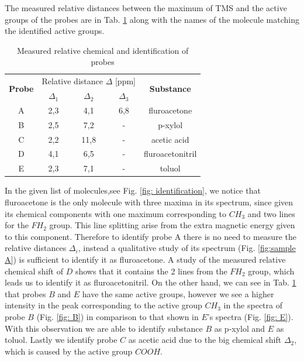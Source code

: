 The measured relative distances between the maximum of TMS and the active groups of the probes are in Tab. \ref{tab: identification} along with the names of the molecule matching the identified active groups.
\begin{table}[!htbp]
 \begin{center}
  \caption{ Measured relative chemical and identification of probes}
  \label{tab: identification}
  \begin{tabular}{|c||c|c|c|c|}
  \hline
 	\multirow{2}{*}{\textbf{Probe}} & \multicolumn{3}{c}{Relative distance $\Delta$ [ppm]} &\multirow{2}{*}{ \textbf{Substance}} \\
								   &	 $\Delta_1$ & $\Delta_2$ &  $\Delta_3$ & \\
\hline
\hline
 	A & 2,3 & 4,1 & 6,8& fluroacetone \\
 	B & 2,5 & 7,2 & - & p-xylol \\
 	C & 2,2 & 11,8& - & acetic acid \\
 	D & 4,1 & 6,5 & - & fluroacetonitril \\
 	E & 2,3 & 7,1 & - & toluol \\
 	\hline
  \end{tabular}
 \end{center}
\end{table}

In the given list of molecules,see Fig. \ref{fig: identification}, we notice that fluroacetone is the only molecule with three maxima in its spectrum, since given its chemical components with one maximum corresponding to $CH_3$ and two lines for the $FH_2$ group. This line splitting arise from the extra magnetic energy given to this component. Therefore to identify probe A there is no need to measure the relative distances $\Delta_i$, instead a qualitative study of its spectrum (Fig. \ref{fig:sample A}) is sufficient to identify it as fluroacetone. 
A study of the measured relative chemical shift of $D$ shows that it contains the 2 lines from the $FH_2$ group, which leads us to identify it as fluroacetonitril.  
On the other hand, we can see in Tab. \ref{tab: identification} that probes $B$ and $E$ have the same active groups, however we see a higher intensity in the peak corresponding to the active group $CH_3$ in the spectra of probe $B$ (Fig. \ref{fig: B}) in comparison to that shown in $E$'s spectra (Fig. \ref{fig: E}). With this observation we are able to identify substance $B$ as p-xylol and $E$ as toluol. 
Lastly we identify probe $C$ as acetic acid due to the big chemical shift $\Delta_2$, which is caused by the active group $COOH$.

